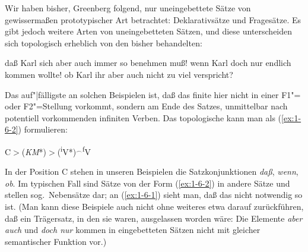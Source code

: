 \documentclass[output=paper]{langsci/langscibook}
\begin{document}
Wir haben bisher, Greenberg folgend, nur uneingebettete Sätze von gewissermaßen
prototypischer Art betrachtet: Deklarativsätze und Fragesätze. Es gibt jedoch weitere
Arten von uneingebetteten Sätzen, und diese unterscheiden sich topologisch erheblich von den bisher behandelten:
\begin{exe}
\ex\label{ex:1-6-1}
\begin{xlist}
\ex\label{ex:1-6-1a} daß Karl sich aber auch immer so benehmen muß!
\ex\label{ex:1-6-1b} wenn Karl doch nur endlich kommen wollte!
\ex\label{ex:1-6-1c} ob Karl ihr aber auch nicht zu viel verspricht?
\end{xlist}
\end{exe}
Das auf"|fälligste an solchen Beispielen ist, daß das finite  hier nicht in einer F1"= oder F2"=Stellung vorkommt, sondern am Ende des Satzes, unmittelbar nach potentiell vorkommenden infiniten Verben. Das topologische  kann man als (\ref{ex:1-6-2})
formulieren:
\begin{exe}
\ex\label{ex:1-6-2}
C$>$(\textit{KM}*)$>$(\textsuperscript{i}V*)$^{\smallfrown}$\textsuperscript{f}V
\end{exe}
In der Position C stehen in unseren Beispielen die Satzkonjunktionen \textit{daß}, \textit{wenn},
\textit{ob}. Im typischen Fall sind Sätze von der Form (\ref{ex:1-6-2}) in andere Sätze  und stellen sog.\ Nebensätze dar; an (\ref{ex:1-6-1}) sieht man, daß das nicht notwendig so ist. (Man kann diese Beispiele auch nicht ohne weiteres etwa darauf zurückführen, daß ein
Trägersatz, in den sie  waren, ausgelassen worden wäre: Die Elemente
\textit{aber auch} und \textit{doch nur} kommen in eingebetteten Sätzen nicht mit gleicher semantischer Funktion vor.)
\end{document}
